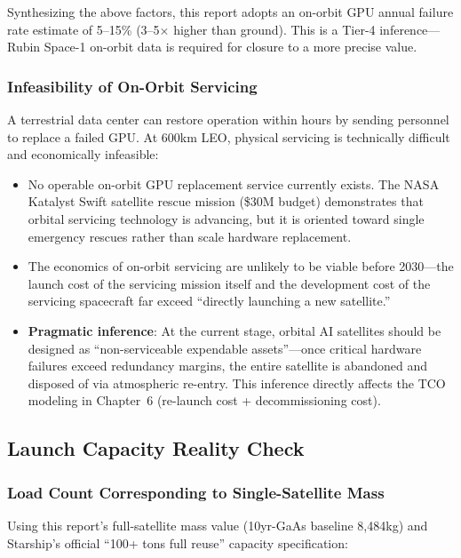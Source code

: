 Synthesizing the above factors, this report adopts an on-orbit GPU annual failure rate estimate of 5--15\% (3--5$\times$ higher than ground). This is a Tier-4 inference---Rubin Space-1 on-orbit data is required for closure to a more precise value.

\subsubsection{Infeasibility of On-Orbit Servicing}

A terrestrial data center can restore operation within hours by sending personnel to replace a failed GPU. At 600\;km LEO, physical servicing is technically difficult and economically infeasible:

\begin{itemize}[leftmargin=*]
    \item No operable on-orbit GPU replacement service currently exists. The NASA Katalyst Swift satellite rescue mission (\$30M budget) demonstrates that orbital servicing technology is advancing, but it is oriented toward single emergency rescues rather than scale hardware replacement\cite{nasa2026katalyst}.
    \item The economics of on-orbit servicing are unlikely to be viable before 2030---the launch cost of the servicing mission itself and the development cost of the servicing spacecraft far exceed ``directly launching a new satellite.''
    \item \textbf{Pragmatic inference}: At the current stage, orbital AI satellites should be designed as ``non-serviceable expendable assets''---once critical hardware failures exceed redundancy margins, the entire satellite is abandoned and disposed of via atmospheric re-entry. This inference directly affects the TCO modeling in Chapter~6 (re-launch cost + decommissioning cost).
\end{itemize}

\subsection{Launch Capacity Reality Check}

\subsubsection{Load Count Corresponding to Single-Satellite Mass}

Using this report's full-satellite mass value (10yr-GaAs baseline 8,484\;kg) and Starship's official ``100+ tons full reuse'' capacity specification:

